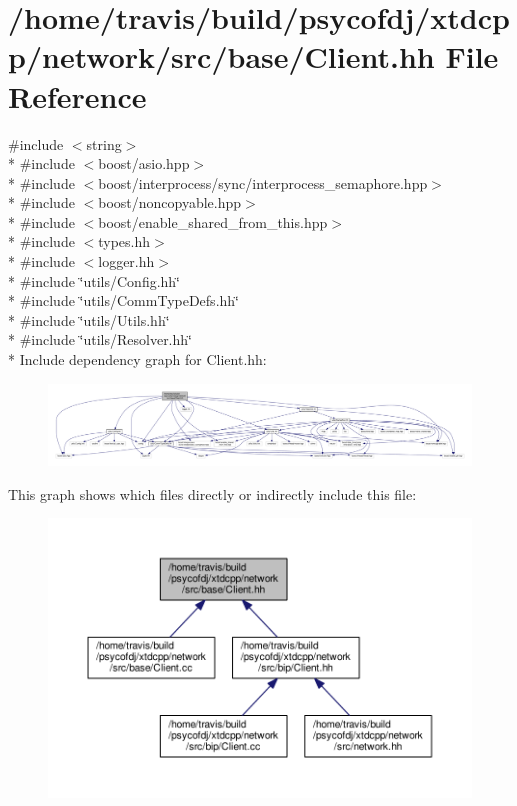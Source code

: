 \hypertarget{base_2Client_8hh}{\section{/home/travis/build/psycofdj/xtdcpp/network/src/base/\-Client.hh File Reference}
\label{base_2Client_8hh}
}
{\ttfamily \#include $<$string$>$}\\*
{\ttfamily \#include $<$boost/asio.\-hpp$>$}\\*
{\ttfamily \#include $<$boost/interprocess/sync/interprocess\-\_\-semaphore.\-hpp$>$}\\*
{\ttfamily \#include $<$boost/noncopyable.\-hpp$>$}\\*
{\ttfamily \#include $<$boost/enable\-\_\-shared\-\_\-from\-\_\-this.\-hpp$>$}\\*
{\ttfamily \#include $<$types.\-hh$>$}\\*
{\ttfamily \#include $<$logger.\-hh$>$}\\*
{\ttfamily \#include \char`\"{}utils/\-Config.\-hh\char`\"{}}\\*
{\ttfamily \#include \char`\"{}utils/\-Comm\-Type\-Defs.\-hh\char`\"{}}\\*
{\ttfamily \#include \char`\"{}utils/\-Utils.\-hh\char`\"{}}\\*
{\ttfamily \#include \char`\"{}utils/\-Resolver.\-hh\char`\"{}}\\*
Include dependency graph for Client.\-hh\-:
\nopagebreak
\begin{figure}[H]
\begin{center}
\leavevmode
\includegraphics[width=350pt]{base_2Client_8hh__incl}
\end{center}
\end{figure}
This graph shows which files directly or indirectly include this file\-:
\nopagebreak
\begin{figure}[H]
\begin{center}
\leavevmode
\includegraphics[width=350pt]{base_2Client_8hh__dep__incl}
\end{center}
\end{figure}
